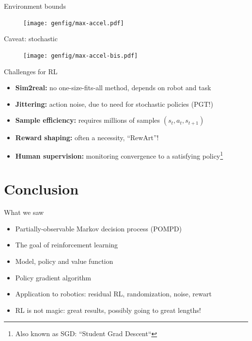 \documentclass[11pt, aspectratio=169]{beamer}
\begin{document}
\begin{frame}{Environment bounds}
    \begin{figure}
        \texttt{[image: genfig/max-accel.pdf]}
    \end{figure}
\end{frame}

\begin{frame}{Caveat: stochastic}
    \begin{figure}
        \texttt{[image: genfig/max-accel-bis.pdf]}
    \end{figure}
\end{frame}


\begin{frame}{Challenges for RL}
    \begin{itemize}
        \item \textbf{Sim2real:} no one-size-fits-all method, depends on robot and task
        \item \textbf{Jittering:} action noise, due to need for stochastic policies (PGT!)
        \item \textbf{Sample efficiency:} requires millions of samples $(s_t, a_t, s_{t+1})$
        \item \textbf{Reward shaping:} often a necessity, ``RewArt''!
        \item \textbf{Human supervision:} monitoring convergence to a satisfying policy\footnote{ Also known as SGD: ``Student Grad Descent``}
    \end{itemize}
\end{frame}

\section{Conclusion}

\begin{frame}{What we saw}
    \begin{itemize}
        \item Partially-observable Markov decision process (POMPD)
        \item The goal of reinforcement learning
        \item Model, policy and value function
        \item Policy gradient algorithm
        \item Application to robotics: residual RL, randomization, noise, rewart
        \item RL is not magic: great results, possibly going to great lengths!
    \end{itemize}
\end{frame}
\end{document}
